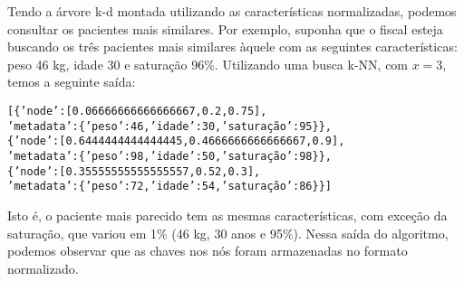         Tendo a árvore k-d montada utilizando as características normalizadas, podemos consultar os pacientes mais similares. Por exemplo, suponha que o fiscal esteja buscando os três pacientes mais similares àquele com as seguintes características: peso 46 kg, idade 30 e saturação 96\%. Utilizando uma busca k-NN, com $x = 3$, temos a seguinte saída:
        \begin{alltt}
[\{'node': [0.06666666666666667, 0.2, 0.75],
  'metadata': \{'peso': 46, 'idade': 30, 'saturação': 95\}\},
 \{'node': [0.6444444444444445, 0.4666666666666667, 0.9],
  'metadata': \{'peso': 98, 'idade': 50, 'saturação': 98\}\},
 \{'node': [0.35555555555555557, 0.52, 0.3],
  'metadata': \{'peso': 72, 'idade': 54, 'saturação': 86\}\}]
        \end{alltt}
        Isto é, o paciente mais parecido tem as mesmas características, com exceção da saturação, que variou em 1\% (46 kg, 30 anos e 95\%). Nessa saída do algoritmo, podemos observar que as chaves nos nós foram armazenadas no formato normalizado.
